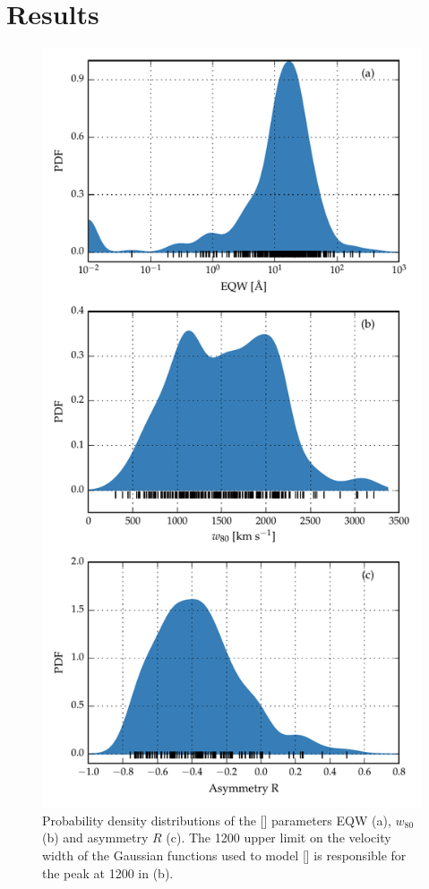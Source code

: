 \section{Results}

\begin{figure}
    \centering
    \includegraphics[width=0.8\columnwidth]{figures/chapter04/parameter_hists.pdf} 
    \caption[{Probability density distributions of the [] parameters EQW (a), $w_{80}$ (b) and asymmetry $R$ (c).}]{Probability density distributions of the [] parameters EQW (a), $w_{80}$ (b) and asymmetry $R$ (c). The 1200 \kms upper limit on the velocity width of the Gaussian functions used to model [] is responsible for the peak at 1200 \kms in (b).}     
    \label{fig:parameter_hists}
\end{figure}

